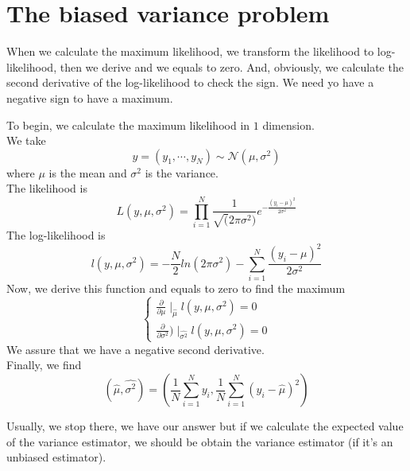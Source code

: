 \documentclass{article}
\begin{document}
\section{The biased variance problem}
When we calculate the maximum likelihood, we transform the likelihood to log-likelihood, then we derive and we equals to zero. And, obviously, we calculate the second derivative of the log-likelihood to check the sign. We need yo have a negative sign to have a maximum.\\
\begin{exemple}
To begin, we calculate the maximum likelihood in $1$ dimension.\\
We take
\[ y = (y_1, \cdots, y_N) \sim \mathcal{N}(\mu, \sigma^2) \]
where $\mu$ is the mean and $\sigma^2$ is the variance.\\
The likelihood is \[ L(y, \mu, \sigma^2) = \prod_{i=1}^N \frac{1}{\sqrt(2\pi \sigma^2)}e^{-\frac{(y_i-\mu)^2}{2\sigma^2}} \]
The log-likelihood is \[l(y, \mu, \sigma^2) = -\frac{N}{2}ln(2\pi\sigma^2)-\sum_{i=1}^N\frac{(y_i-\mu)^2}{2\sigma^2}\]
Now, we derive this function and equals to zero to find the maximum
\begin{equation*}
    \begin{cases}
        \frac{\partial}{\partial \mu}\mid_{\hat{\mu}}l(y, \mu, \sigma^2) = 0 \\
        \frac{\partial}{\partial \sigma^2})\mid_{\widehat{\sigma^2}}l(y, \mu, \sigma^2) = 0
    \end{cases}
\end{equation*}
We assure that we have a negative second derivative.\\
Finally, we find \[ (\hat{\mu}, \widehat{\sigma^2}) = (\frac{1}{N} \sum_{i=1}^N y_i, \frac{1}{N} \sum_{i=1}^N(y_i-\hat{\mu})^2)\]
\end{exemple}
Usually, we stop there, we have our answer but if we calculate the expected value of the variance estimator, we should be obtain the variance estimator (if it's an unbiased estimator).\\
\end{document}
